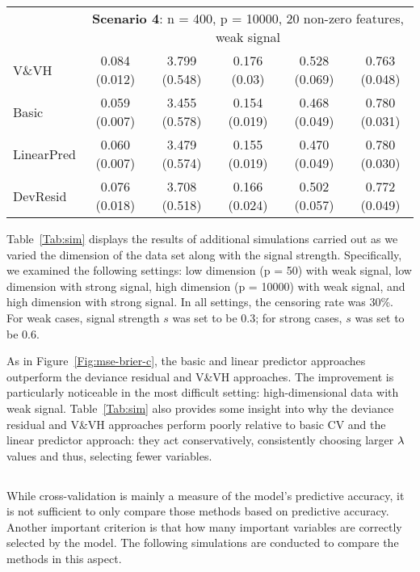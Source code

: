 \begin{table}[!htb]
\begin{tabular}[t]{lccccc}
&\multicolumn{5}{c}{\textbf{Scenario 4}: n = 400, p = 10000, 20 non-zero features, weak signal}\\
\cline{2-6}
V\&VH  & 0.084 (0.012) & 3.799 (0.548) & 0.176 (0.03) & 0.528 (0.069) & 0.763 (0.048) \\
Basic  & 0.059 (0.007) & 3.455 (0.578) & 0.154 (0.019) & 0.468 (0.049) & 0.780 (0.031) \\
LinearPred  & 0.060 (0.007) & 3.479 (0.574) & 0.155 (0.019) & 0.470 (0.049) & 0.780 (0.030) \\
DevResid  & 0.076 (0.018) & 3.708 (0.518) & 0.166 (0.024) & 0.502 (0.057) & 0.772 (0.049) \\
\bottomrule
\end{tabular}
\end{table}

Table~\ref{Tab:sim} displays the results of additional simulations carried out as we varied the dimension of the data set along with the signal strength.  Specifically, we examined the following settings: low dimension (p = 50) with weak signal, low dimension with strong signal, high dimension (p = 10000) with weak signal, and high dimension with strong signal. In all settings, the censoring rate was 30\%. For weak cases, signal strength $s$ was set to be 0.3; for strong cases, $s$ was set to be 0.6. 

As in Figure~\ref{Fig:mse-brier-c}, the basic and linear predictor approaches outperform the deviance residual and V\&VH approaches.  The improvement is particularly noticeable in the most difficult setting: high-dimensional data with weak signal.  Table~\ref{Tab:sim} also provides some insight into why the deviance residual and V\&VH approaches perform poorly relative to basic CV and the linear predictor approach: they act conservatively, consistently choosing larger $\lambda$ values and thus, selecting fewer variables.


\subsection{}
\label{Sec:power}

While cross-validation is mainly a measure of the model's predictive accuracy, it is not sufficient to only compare those methods based on predictive accuracy. Another important criterion is that how many important variables are correctly selected by the model. The following simulations are conducted to compare the methods in this aspect.


